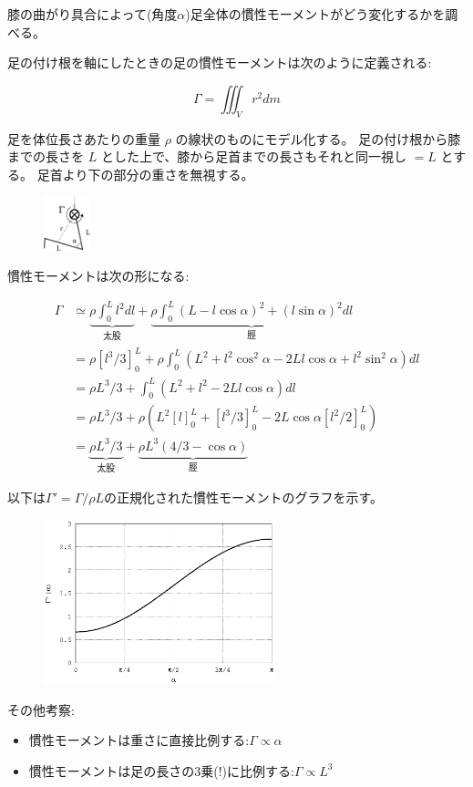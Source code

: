 \documentclass[11pt]{article}
\begin{document}
膝の曲がり具合によって(角度$\alpha$)足全体の慣性モーメントがどう変化するかを調べる。

足の付け根を軸にしたときの足の慣性モーメントは次のように定義される:

\begin{equation}
\Gamma = \iiint_V r^2 dm
\end{equation}

足を体位長さあたりの重量 $\rho$ の線状のものにモデル化する。
足の付け根から膝までの長さを $L$ とした上で、膝から足首までの長さもそれと同一視し $=L$ とする。 足首より下の部分の重さを無視する。

\begin{figure}[h!]
\centering
\includegraphics[width=0.12\textwidth]{leg_model.eps}
\end{figure}
慣性モーメントは次の形になる:

\begin{equation}
\begin{split}
\Gamma & \simeq \underbrace{\rho\int_0^L l^2 dl}_{太股} + \underbrace{\rho\int_0^L (L - l\cos\alpha)^2 + (l\sin\alpha)^2 dl}_{脛}\\
 & = \rho\left[l^3/3\right]_0^L + \rho\int_0^L (L^2 + l^2\cos^2\alpha - 2Ll\cos\alpha + l^2\sin^2\alpha) dl\\
 & = \rho L^3/3 + \int_0^L (L^2 + l^2 - 2Ll\cos\alpha) dl\\
 & = \rho L^3/3 + \rho\left(L^2\left[l\right]_0^L + \left[l^3/3\right]_0^L - 2L\cos\alpha\left[l^2/2\right]_0^L \right)\\
 & = \underbrace{\rho L^3/3}_{太股} + \underbrace{\rho L^3\left(4/3 - \cos\alpha  \right)}_{脛}
\end{split}
\end{equation}

以下は$\Gamma'=\Gamma/\rho{}L$の正規化された慣性モーメントのグラフを示す。

\begin{figure}[h!]
\centering
\includegraphics[width=0.6\textwidth]{plot.eps}
\end{figure}

その他考察:
\begin{itemize}
\item 慣性モーメントは重さに直接比例する:$\Gamma\propto\alpha$
\item 慣性モーメントは足の長さの3乗(!)に比例する:$\Gamma\propto{}L^3$
\end{itemize}
\end{document}
